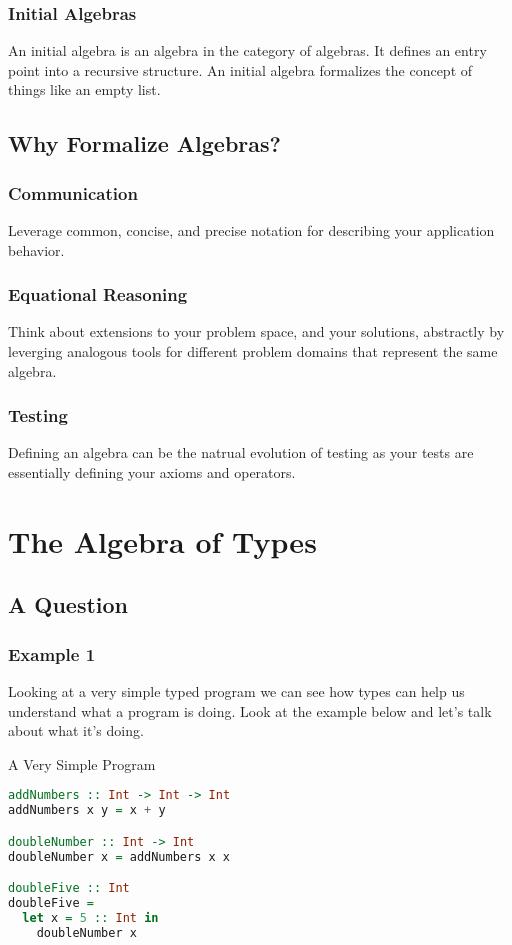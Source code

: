 \documentclass{beamer}
\begin{document}
\begin{frame}
  \frametitle{Initial Algebras}
  An initial algebra is an algebra in the category of algebras.  It
  defines an entry point into a recursive structure.  An initial
  algebra formalizes the concept of things like an empty list.
\end{frame}

\subsection{Why Formalize Algebras?}

\begin{frame}
  \frametitle{Communication}
  Leverage common, concise, and precise notation for describing your application behavior.
\end{frame}

\begin{frame}
  \frametitle{Equational Reasoning}
  Think about extensions to your problem space, and your solutions,
  abstractly by leverging analogous tools for different problem
  domains that represent the same algebra.
\end{frame}

\begin{frame}
  \frametitle{Testing}
  Defining an algebra can be the natrual evolution of testing as your
  tests are essentially defining your axioms and operators.
\end{frame}

\section{The Algebra of Types}

\subsection{A Question}

\begin{frame}[fragile]
  \frametitle{Example 1}
  Looking at a very simple typed program we can see how types can help
  us understand what a program is doing.  Look at the example below
  and let's talk about what it's doing.
  \begin{exampleblock}{A Very Simple Program}
    \begin{lstlisting}[language=haskell]
addNumbers :: Int -> Int -> Int
addNumbers x y = x + y

doubleNumber :: Int -> Int
doubleNumber x = addNumbers x x

doubleFive :: Int
doubleFive =
  let x = 5 :: Int in
    doubleNumber x
    \end{lstlisting}
  \end{exampleblock}
\end{frame}
\end{document}
